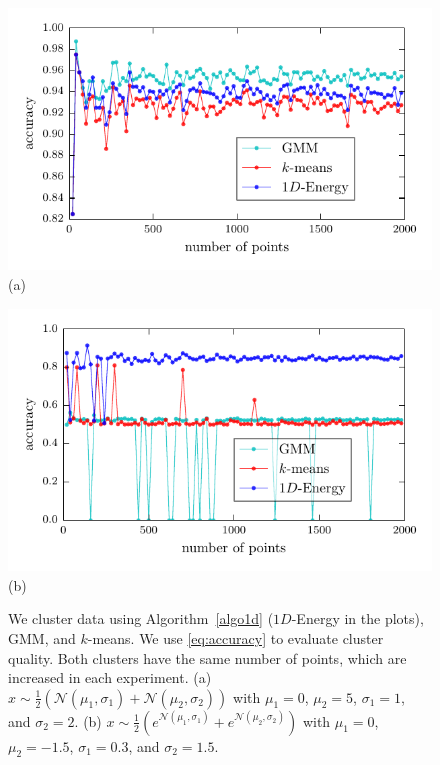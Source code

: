 \documentclass[aps,preprint,nofootinbib,floatfix]{revtex4-1}
\begin{document}
\begin{figure}
\begin{minipage}{0.49\textwidth}
\includegraphics[width=\textwidth]{normal.pdf}\\[-1em]
(a)
\end{minipage}
\begin{minipage}{0.49\textwidth}
\includegraphics[width=\textwidth]{lognormal.pdf}\\[-1em]
(b)
\end{minipage}
\caption{
\label{fig:1d}
We cluster data using Algorithm~\ref{algo1d} ($1D$-Energy in the plots), 
GMM, and $k$-means. We use
\eqref{eq:accuracy} to evaluate cluster quality. Both clusters
have the same number of points, which are increased in each experiment.
(a) 
$x\sim \tfrac{1}{2}\left( \mathcal{N}(\mu_1,\sigma_1) +
\mathcal{N}(\mu_2,\sigma_2)  \right)$ with 
$\mu_1 = 0$,
$\mu_2 = 5$,
$\sigma_1 = 1$, and
$\sigma_2 = 2$.
(b) 
$x\sim \tfrac{1}{2}\left( e^{\mathcal{N}(\mu_1,\sigma_1)} +
e^{\mathcal{N}(\mu_2,\sigma_2)}  \right)$ with 
$\mu_1 = 0$,
$\mu_2 = -1.5$,
$\sigma_1 = 0.3$, and
$\sigma_2 = 1.5$.
}
\end{figure}
\end{document}
